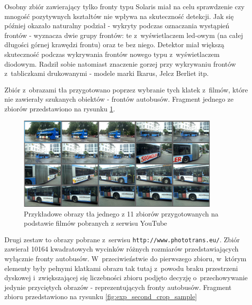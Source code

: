 Osobny zbiór zawierający tylko fronty typu Solaris miał na celu
sprawdzenie czy mnogość pozytywnych kształtów nie wpływa na skuteczność
detekcji. Jak się później okazało naturalny podział
- wykryty podczas oznaczania wystąpień frontów - 
wyznacza dwie grupy frontów: te z~wyświetlaczem led-owym (na całej
długości górnej krawędzi frontu) oraz te bez niego. Detektor
miał większą skuteczność podczas wykrywania frontów nowego typu
z~wyświetlaczem diodowym. Radził sobie natomiast znaczenie gorzej przy
wykrywaniu frontów z~tabliczkami drukowanymi - modele marki
Ikarus, Jelcz Berliet itp.

Zbiór z~obrazami tła
przygotowano poprzez wybranie tych klatek z~filmów, które nie
zawierały szukanych obiektów - frontów autobusów. Fragment
jednego ze zbiorów przedstawiono na rysunku \ref{fig:exp_first_background_sample}.

\begin{figure}[!h]
	\centering
	\includegraphics[width=0.9\textwidth]{img/exp_first_background_sample}
	\caption{Przykładowe obrazy tła jednego z 11 zbiorów
		przygotowanych na podstawie
		filmów pobranych z serwisu YouTube}
	\label{fig:exp_first_background_sample}
\end{figure}

Drugi zestaw
to obrazy pobrane z~serwisu \verb|http://www.phototrans.eu/|.
Zbiór zawierał 10164 kwadratowych wycinków różnych rozmiarów
przedstawiających wyłącznie fronty autobusów. W~przeciwieństwie
do pierwszego zbioru, w~którym elementy były pełnymi klatkami
obrazu tak tutaj z~powodu braku przestrzeni dyskowej
i~zwiększającej się liczebności zbioru podjęto decyzję o~przechowywanie
jedynie przyciętych obrazów - reprezentujących fronty autobusów.
Fragment zbioru przedstawiono na rysunku \ref{fig:exp_second_crop_sample}

